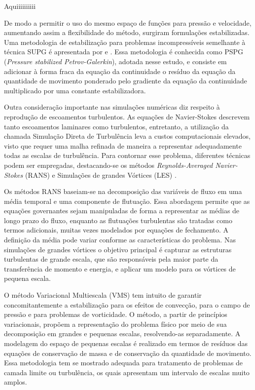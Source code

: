 \documentclass[tese_patricia.tex]{subfiles}
\begin{document}
Aquiiiiiiiiii

De modo a permitir o uso do mesmo espaço de funções para pressão e velocidade, aumentando assim a flexibilidade do método, surgiram formulações estabilizadas. Uma metodologia de estabilização para problemas incompressíveis semelhante à técnica SUPG é apresentada por  e . Essa metodologia é conhecida como PSPG (\textit{Pressure stabilized Petrov-Galerkin}), adotada nesse estudo, e consiste em adicionar à forma fraca da equação da continuidade o resíduo da equação da quantidade de movimento ponderado pelo gradiente da equação da continuidade multiplicado por uma constante estabilizadora. 

Outra consideração importante nas simulações numéricas diz respeito à reprodução de escoamentos turbulentos. As equações de Navier-Stokes descrevem tanto escoamentos laminares como turbulentos, entretanto, a utilização da chamada Simulação Direta de Turbulência leva a custos computacionais elevados, visto que requer uma malha refinada de maneira a representar adequadamente todas as escalas de turbulência. Para contornar esse problema, diferentes técnicas podem ser empregadas, destacando-se os métodos \textit{Reynolds-Averaged Navier-Stokes} (RANS) \cite{Speziale1991,Alfonsi2009} e Simulações de grandes Vórtices (LES) \cite{LaunderS:1972,Germano1991,Wilcox:1993,PIOMELLI1999}.

Os métodos RANS baseiam-se na decomposição das variáveis de fluxo em uma média temporal e uma componente de flutuação. Essa abordagem permite que as equações governantes sejam manipuladas de forma a representar as médias de longo prazo do fluxo, enquanto as flutuações turbulentas são tratadas como termos adicionais, muitas vezes modelados por equações de fechamento. A definição da média pode variar conforme as características do problema. Nas simulações de grandes vórtices o objetivo principal é capturar as estruturas turbulentas de grande escala, que são responsáveis pela maior parte da transferência de momento e energia, e aplicar um modelo para os vórtices de pequena escala. 

O método Variacional Multiescala (VMS) \cite{Hughes:1995,Hughesetal:1998,Hughesetal:2001,BazilevsTT:2013} tem intuito de garantir concomitantemente a estabilização para os efeitos de convecção, para o campo de pressão e para problemas de vorticidade. O método, a partir de princípios variacionais, propõem a representação do problema físico por meio de sua decomposição em grandes e pequenas escalas, resolvendo-as separadamente.  A modelagem do espaço de pequenas escalas é realizado em termos de resíduos das equações de conservação de massa e de conservação da quantidade de movimento. Essa metodologia tem se mostrado adequada para tratamento de problemas de camada limite ou turbulência, os quais apresentam um intervalo de escalas muito amplos.
\end{document}
